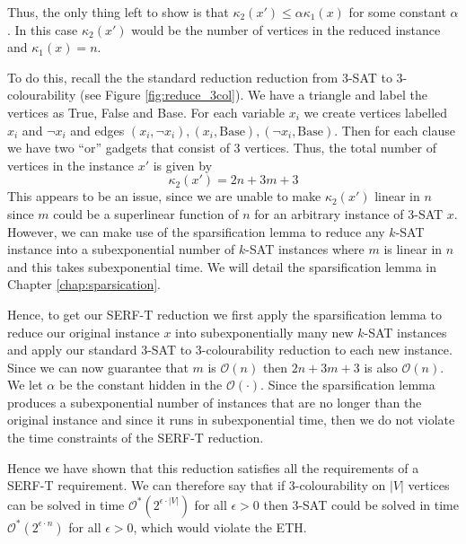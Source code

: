 Thus, the only thing left to show is that $\kappa_2(x') \leq \alpha \kappa_1(x)$ for
some constant $\alpha$. In this case $\kappa_2(x')$ would be the number of vertices
in the reduced instance and $\kappa_1(x) = n$.

To do this, recall the the standard reduction reduction from 3-SAT to 3-colourability
(see Figure \ref{fig:reduce_3col}).
We have a triangle and label the vertices as True, False and Base.
For each variable $x_i$ we create vertices labelled $x_i$ and $\neg x_i$ and
edges $(x_i, \neg x_i), (x_i, \text{Base}), (\neg x_i, \text{Base})$. Then
for each clause we have two ``or'' gadgets that consist of 3 vertices.
Thus, the total number of vertices in the instance $x'$ is given by
\begin{equation}
    \kappa_2(x') = 2n + 3m + 3
\end{equation}
This appears to be an issue, since we are unable to make $\kappa_2(x')$ linear in $n$
since $m$ could be a superlinear function of $n$ for an arbitrary instance of 3-SAT $x$.
However, we can make use of the sparsification lemma \cite{impagliazzo2001problems} to
reduce any $k$-SAT instance into a subexponential number of $k$-SAT instances where
$m$ is linear in $n$ and this takes subexponential time. We will detail the
sparsification lemma in Chapter \ref{chap:sparsication}.

Hence, to get our SERF-T reduction we first apply the sparsification lemma to
reduce our original instance $x$ into subexponentially many new $k$-SAT instances
and apply our standard 3-SAT to 3-colourability reduction to each new instance.
Since we can now guarantee that $m$ is $\mathcal{O}(n)$ then $2n + 3m + 3$ is also
$\mathcal{O}(n)$. We let $\alpha$ be the constant hidden in the $\mathcal{O}(\cdot)$.
Since the sparsification lemma produces a subexponential number of instances that
are no longer than the original instance and since it runs in subexponential time, then
we do not violate the time constraints of the SERF-T reduction.

Hence we have shown that this reduction satisfies all the requirements of a SERF-T
requirement. We can therefore say that if 3-colourability on $|V|$ vertices can
be solved in time $\mathcal{O}^{\ast}(2^{\epsilon \cdot |V|})$ for all $\epsilon > 0$
then 3-SAT could be solved in time $\mathcal{O}^{\ast}(2^{\epsilon \cdot n})$ 
for all $\epsilon > 0$, which would violate the ETH.

